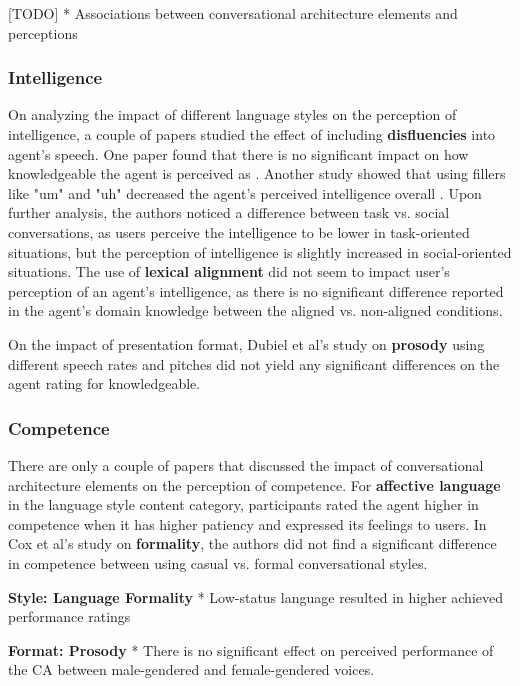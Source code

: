 \documentclass[sigconf,screen,review, anonymous]{acmart}
\newcommand{\cmt}[1]{}%
\begin{document}
[TODO] * Associations between conversational architecture elements and perceptions

\subsubsection{Intelligence}

On analyzing the impact of different language styles on the perception of intelligence, a couple of papers studied the effect of including \textbf{disfluencies} into agent's speech. One paper found that there is no significant impact on how knowledgeable the agent is perceived as \cite{pfeifer2009should}\cmt{[12]}. Another study showed that using fillers like "um" and "uh" decreased the agent's perceived intelligence overall \cite{jeong2019exploring}\cmt{[10]}. Upon further analysis, the authors noticed a difference between task vs. social conversations, as users perceive the intelligence to be lower in task-oriented situations, but the perception of intelligence is slightly increased in social-oriented situations. The use of \textbf{lexical alignment} did not seem to impact user's perception of an agent's intelligence, as there is no significant difference reported in the agent's domain knowledge between the aligned vs. non-aligned conditions.

On the impact of presentation format, Dubiel et al's study on \textbf{prosody} using different speech rates and pitches did not yield any significant differences on the agent rating for knowledgeable.

\subsubsection{Competence}

There are only a couple of papers that discussed the impact of conversational architecture elements on the perception of competence. For \textbf{affective language} in the language style content category, participants rated the agent higher in competence when it has higher patiency and expressed its feelings to users. In Cox et al's study on \textbf{formality}, the authors did not find a significant difference in competence between using casual vs. formal conversational styles.

\textbf{Style: Language Formality}
*  Low-status language resulted in higher achieved performance ratings \cite{habler2019effects}\cmt{[63]}

\textbf{Format: Prosody}
* There is no significant effect on perceived performance of the CA between male-gendered and female-gendered voices. \cite{habler2019effects}\cmt{[63]}
\end{document}
